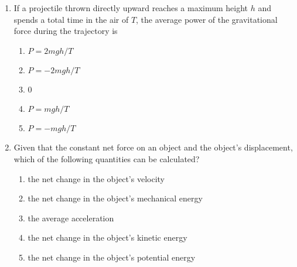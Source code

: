 \documentclass{../../../oss-classkick}
\begin{document}
\begin{multicols}{2}
\begin{enumerate}[leftmargin=18pt,resume]
%
%
%
    
  \item If a projectile thrown directly upward reaches a maximum height $h$ and
    spends a total time in the air of $T$, the average power of the
    gravitational force during the trajectory is
    \begin{enumerate}[nosep,label=(\Alph*)]
    \item $P=2mgh/T$
    \item $P=-2mgh/T$
    \item 0
    \item $P=mgh/T$
    \item $P=-mgh/T$
    \end{enumerate}
    \vspace{.7in}
    
  \item Given that the constant net force on an object and the object's 
    displacement, which of the following quantities can be calculated?
    \begin{enumerate}[nosep,label=(\Alph*)]
    \item the net change in the object's velocity
    \item the net change in the object's mechanical energy
    \item the average acceleration
    \item the net change in the object's kinetic energy
    \item the net change in the object's potential energy
    \end{enumerate}
    \vspace{.8in}
    

\end{enumerate}
\end{multicols}
\end{document}

